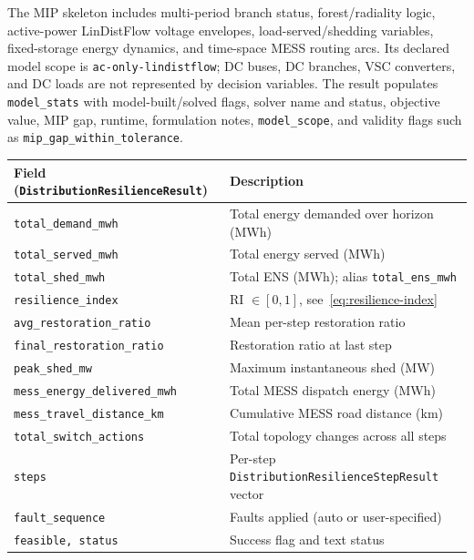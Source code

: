 The MIP skeleton includes multi-period branch status, forest/radiality logic,
active-power LinDistFlow voltage envelopes, load-served/shedding variables,
fixed-storage energy dynamics, and time-space MESS routing arcs.  Its declared
model scope is \texttt{ac-only-lindistflow}; DC buses, DC branches, VSC
converters, and DC loads are not represented by decision variables.  The result
populates \texttt{model\_stats} with model-built/solved flags, solver name and
status, objective value, MIP gap, runtime, formulation notes,
\texttt{model\_scope}, and validity flags such as
\texttt{mip\_gap\_within\_tolerance}.

\begin{center}
\begin{tabular}{lp{75mm}}
\hline\hline
\textbf{Field (\texttt{DistributionResilienceResult})} & \textbf{Description} \\
\hline
\texttt{total\_demand\_mwh}      & Total energy demanded over horizon (MWh) \\
\texttt{total\_served\_mwh}      & Total energy served (MWh) \\
\texttt{total\_shed\_mwh}        & Total ENS (MWh); alias \texttt{total\_ens\_mwh} \\
\texttt{resilience\_index}       & RI $\in[0,1]$, see~\eqref{eq:resilience-index} \\
\texttt{avg\_restoration\_ratio} & Mean per-step restoration ratio \\
\texttt{final\_restoration\_ratio} & Restoration ratio at last step \\
\texttt{peak\_shed\_mw}          & Maximum instantaneous shed (MW) \\
\texttt{mess\_energy\_delivered\_mwh} & Total MESS dispatch energy (MWh) \\
\texttt{mess\_travel\_distance\_km}   & Cumulative MESS road distance (km) \\
\texttt{total\_switch\_actions}  & Total topology changes across all steps \\
\texttt{steps}                   & Per-step \texttt{DistributionResilienceStepResult} vector \\
\texttt{fault\_sequence}         & Faults applied (auto or user-specified) \\
\texttt{feasible, status}        & Success flag and text status \\
\hline\hline
\end{tabular}
\end{center}

